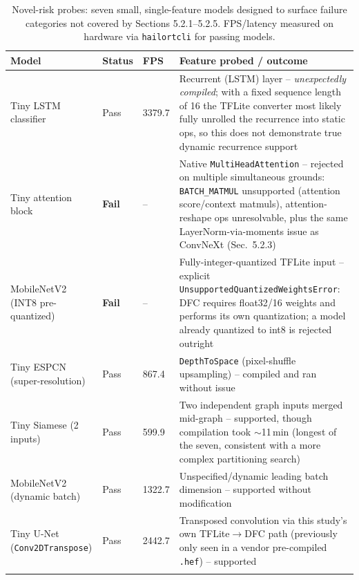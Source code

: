 \documentclass[11pt]{article}
\begin{document}
\begin{longtable}{@{}p{4cm}p{1.3cm}p{1.3cm}p{6.4cm}@{}}
\toprule
\textbf{Model} & \textbf{Status} & \textbf{FPS} & \textbf{Feature probed / outcome} \\
\midrule
\endhead
Tiny LSTM classifier & Pass & 3379.7 & Recurrent (LSTM) layer -- \emph{unexpectedly compiled}; with a fixed sequence length of 16 the TFLite converter most likely fully unrolled the recurrence into static ops, so this does not demonstrate true dynamic recurrence support \\
Tiny attention block & \textbf{Fail} & -- & Native \texttt{MultiHeadAttention} -- rejected on multiple simultaneous grounds: \texttt{BATCH\_MATMUL} unsupported (attention score/context matmuls), attention-reshape ops unresolvable, plus the same LayerNorm-via-moments issue as ConvNeXt (Sec.~5.2.3) \\
MobileNetV2 (INT8 pre-quantized) & \textbf{Fail} & -- & Fully-integer-quantized TFLite input -- explicit \texttt{UnsupportedQuantizedWeightsError}: DFC requires float32/16 weights and performs its own quantization; a model already quantized to int8 is rejected outright \\
Tiny ESPCN (super-resolution) & Pass & 867.4 & \texttt{DepthToSpace} (pixel-shuffle upsampling) -- compiled and ran without issue \\
Tiny Siamese (2 inputs) & Pass & 599.9 & Two independent graph inputs merged mid-graph -- supported, though compilation took $\sim$11\,min (longest of the seven, consistent with a more complex partitioning search) \\
MobileNetV2 (dynamic batch) & Pass & 1322.7 & Unspecified/dynamic leading batch dimension -- supported without modification \\
Tiny U-Net (\texttt{Conv2DTranspose}) & Pass & 2442.7 & Transposed convolution via this study's own TFLite$\rightarrow$DFC path (previously only seen in a vendor pre-compiled \texttt{.hef}) -- supported \\
\bottomrule
\caption{Novel-risk probes: seven small, single-feature models designed to
surface failure categories not covered by Sections 5.2.1--5.2.5. FPS/latency
measured on hardware via \texttt{hailortcli} for passing models.}
\end{longtable}
\end{document}

